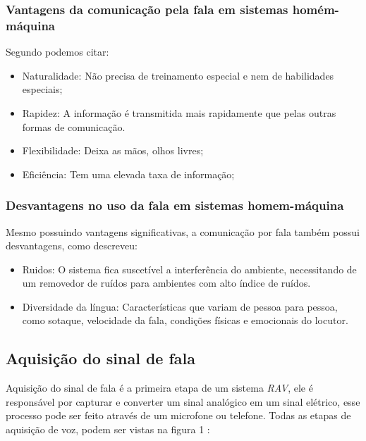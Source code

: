 \subsubsection{Vantagens da comunicação pela fala em sistemas homém-máquina}

Segundo  podemos citar:

\begin{itemize}
\item Naturalidade: Não precisa de treinamento especial e nem de habilidades especiais;
\item Rapidez: A informação é transmitida mais rapidamente que pelas outras formas de comunicação.
\item Flexibilidade: Deixa as mãos, olhos livres;
\item Eficiência: Tem uma elevada taxa de informação;
\end{itemize}

\subsubsection{Desvantagens no uso da fala em sistemas homem-máquina}
Mesmo possuindo vantagens significativas, a comunicação por fala também possui desvantagens, como  descreveu:

\begin{itemize}
\item Ruidos: O sistema fica suscetível a interferência do ambiente, necessitando de um removedor de ruídos para ambientes com alto índice de ruídos.
\item Diversidade da língua: Características que variam de pessoa para pessoa, como sotaque, velocidade da fala, condições físicas e emocionais do locutor. 
\end{itemize}

\subsection{Aquisição do sinal de fala}\label{subsec:fala}
Aquisição do sinal de fala é a primeira etapa de um sistema \textit{RAV}, ele é responsável por capturar e converter um sinal analógico em um sinal elétrico, esse processo pode ser feito através de um microfone ou telefone. Todas as etapas de aquisição de voz, podem ser vistas na figura 1 \cite{RavIsolAnderson}:

